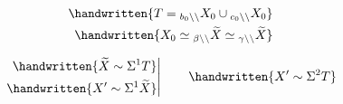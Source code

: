 \[
 \begin{aligned}
 \handwritten{T={}_{b_0\backslash\backslash}X_0\cup{}_{c_0\backslash\backslash}X_0}\\
 \handwritten{X_0\simeq{}_{\beta\backslash\backslash}\widetilde X\simeq{}_{\gamma\backslash\backslash}\widetilde X}
 \end{aligned}
\]

\[
 \left.\begin{aligned}
 \handwritten{\widetilde X\sim\Sigma^1 T}\\
 \handwritten{X'\sim\Sigma^1\widetilde X}
 \end{aligned}\right|\qquad\handwritten{X'\sim\Sigma^2 T}
\]
